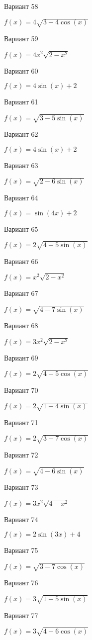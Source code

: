 \documentclass[11pt]{report}
\begin{document}
Вариант 58

$f(x) = 4 \sqrt{3 - 4 \cos{\left(x \right)}}$

Вариант 59

$f(x) = 4 x^{2} \sqrt{2 - x^{2}}$

Вариант 60

$f(x) = 4 \sin{\left(x \right)} + 2$

Вариант 61

$f(x) = \sqrt{3 - 5 \sin{\left(x \right)}}$

Вариант 62

$f(x) = 4 \sin{\left(x \right)} + 2$

Вариант 63

$f(x) = \sqrt{2 - 6 \sin{\left(x \right)}}$

Вариант 64

$f(x) = \sin{\left(4 x \right)} + 2$

Вариант 65

$f(x) = 2 \sqrt{4 - 5 \sin{\left(x \right)}}$

Вариант 66

$f(x) = x^{2} \sqrt{2 - x^{2}}$

Вариант 67

$f(x) = \sqrt{4 - 7 \sin{\left(x \right)}}$

Вариант 68

$f(x) = 3 x^{2} \sqrt{2 - x^{2}}$

Вариант 69

$f(x) = 2 \sqrt{4 - 5 \cos{\left(x \right)}}$

Вариант 70

$f(x) = 2 \sqrt{1 - 4 \sin{\left(x \right)}}$

Вариант 71

$f(x) = 2 \sqrt{3 - 7 \cos{\left(x \right)}}$

Вариант 72

$f(x) = \sqrt{4 - 6 \sin{\left(x \right)}}$

Вариант 73

$f(x) = 3 x^{2} \sqrt{4 - x^{2}}$

Вариант 74

$f(x) = 2 \sin{\left(3 x \right)} + 4$

Вариант 75

$f(x) = \sqrt{3 - 7 \cos{\left(x \right)}}$

Вариант 76

$f(x) = 3 \sqrt{1 - 5 \sin{\left(x \right)}}$

Вариант 77

$f(x) = 3 \sqrt{4 - 6 \cos{\left(x \right)}}$
\end{document}
